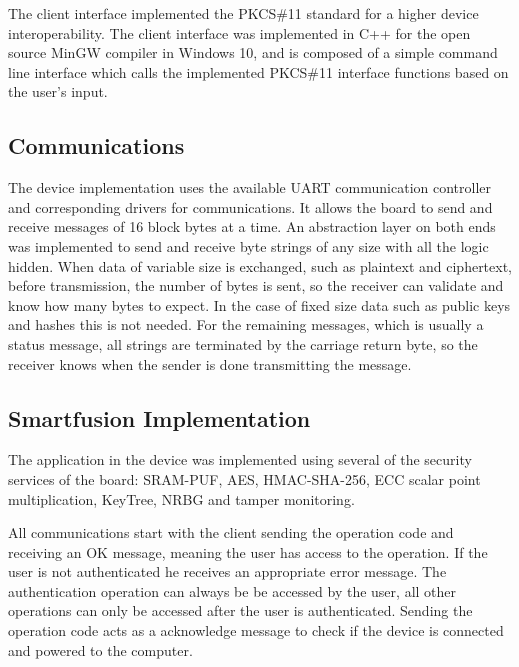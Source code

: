The client interface implemented the \ac{PKCS}\#11 standard for a higher device interoperability. The client interface was implemented in C++ for the open source MinGW compiler in Windows 10, and is composed of a simple command line interface which calls the implemented \ac{PKCS}\#11 interface functions based on the user's input.

\subsection{Communications}\label{chap:implementation:app:comms}

The device implementation uses the available \ac{UART} communication controller and corresponding drivers for communications.
It allows the board to send and receive messages of 16 block bytes at a time.
An abstraction layer on both ends was implemented to send and receive byte strings of any size with all the logic hidden.
When data of variable size is exchanged, such as plaintext and ciphertext, before transmission, the number of bytes is sent, so the receiver can validate and know how many bytes to expect.
In the case of fixed size data such as public keys and hashes this is not needed. For the remaining messages, which is usually a status message, all strings are terminated by the carriage return byte, so the receiver knows when the sender is done transmitting the message.

\subsection{Smartfusion Implementation}\label{chap:implementation:app:board}

The application in the device was implemented using several of the security services of the board: SRAM-PUF, AES, HMAC-SHA-256, ECC scalar point multiplication, KeyTree, \ac{NRBG} and tamper monitoring.

All communications start with the client sending the operation code and receiving an OK message, meaning the user has access to the operation. If the user is not authenticated he receives an appropriate error message.
The authentication operation can always be be accessed by the user, all other operations can only be accessed after the user is authenticated.
Sending the operation code acts as a acknowledge message to check if the device is connected and powered to the computer.

